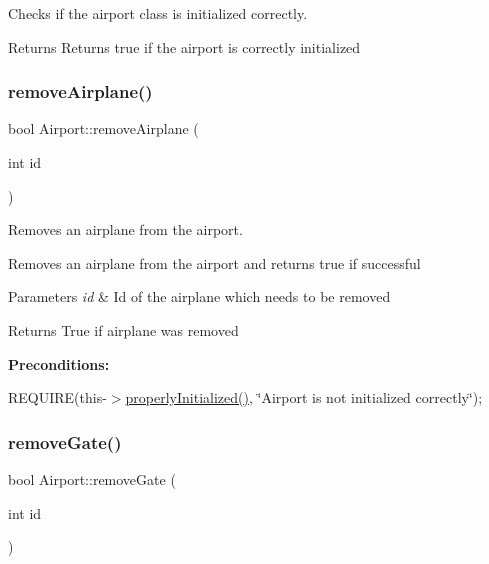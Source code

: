 Checks if the airport class is initialized correctly. 

\begin{DoxyReturn}{Returns}
Returns true if the airport is correctly initialized 
\end{DoxyReturn}
\mbox{\label{class_airport_a4e4929a17d410aac86d2d518648e4284}} 
\subsubsection{\texorpdfstring{remove\+Airplane()}{removeAirplane()}}
{\footnotesize\ttfamily bool Airport\+::remove\+Airplane (\begin{DoxyParamCaption}\item[{int}]{id }\end{DoxyParamCaption})}



Removes an airplane from the airport. 

Removes an airplane from the airport and returns true if successful


\begin{DoxyParams}{Parameters}
{\em id} & Id of the airplane which needs to be removed \\
\hline
\end{DoxyParams}
\begin{DoxyReturn}{Returns}
True if airplane was removed
\end{DoxyReturn}
{\bfseries Preconditions\+:}
\begin{DoxyItemize}
\item R\+E\+Q\+U\+I\+RE(this-\/$>$\mbox{\hyperlink{class_airport_aa13e68ac58e8875837fbe888325cfff6}{properly\+Initialized()}}, \char`\"{}\+Airport is not initialized correctly\char`\"{}); 
\end{DoxyItemize}\mbox{\label{class_airport_ad0c61d46c5c811fb9a2d45be1826088c}} 
\subsubsection{\texorpdfstring{remove\+Gate()}{removeGate()}}
{\footnotesize\ttfamily bool Airport\+::remove\+Gate (\begin{DoxyParamCaption}\item[{int}]{id }\end{DoxyParamCaption})}



